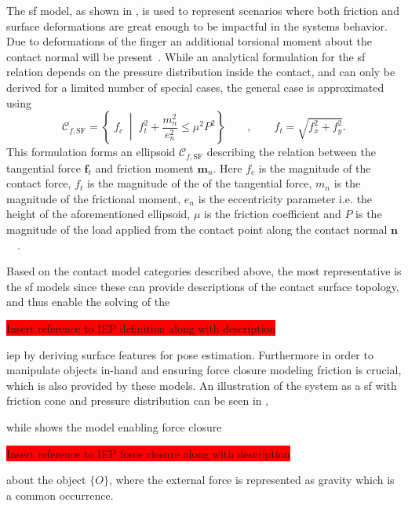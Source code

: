 The \gls{sf} model, as shown in , is used to represent scenarios where both friction and surface deformations are great enough to be impactful in the systems behavior. Due to deformations of the finger an additional torsional moment about the contact normal will be present~\cite[Chapter 38]{handbook-of-robotics}. While an analytical formulation for the \gls{sf} relation depends on the pressure distribution inside the contact, and
can only be derived for a limited number of special cases, the general case is approximated using 
%
\begin{equation} 
	\mathcal{C}_{f,\text{SF}} = \left\{ \; f_c \; \middle| \; f_t^2 + \frac{m_n^2}{e_n^2} \le \mu^2 P^2 \right\} \qquad , \qquad f_t = \sqrt{f_x^2 + f_y^2}.
	\label{eq:sf}
\end{equation}
This formulation forms an ellipsoid $\mathcal{C}_{f,\text{SF}}$ describing the relation between the tangential force $\bm{f}_t$ and friction moment $\bm{m}_n$. Here $f_c$ is the magnitude of the contact force, $f_t$ is the magnitude of the of the tangential force, $m_n$ is the magnitude of the frictional moment, $e_n$ is the eccentricity parameter i.e. the height of the aforementioned ellipsoid, $\mu$ is the friction coefficient and $P$ is the magnitude of the load applied from the contact point along the contact normal $\bm{n}$~\cite{practical-force-motion-models-for-sliding-manipulation}~\cite{soft-finger-model-with-adaptive-contact-geometry-for-grasping-and-manipulation-tasks}. \medskip

Based on the contact model categories described above, the most representative is the \gls{sf} models since these can provide descriptions of the contact surface topology, and thus enable the solving of the 

\colorbox{red}{Insert reference to IEP definition along with description}

\gls{iep} by deriving surface features for pose estimation. Furthermore in order to manipulate objects in-hand and ensuring force closure modeling friction is crucial, which is also provided by these models. An illustration of the system as a \gls{sf} with friction cone and pressure distribution can be seen in , 

while  shows the model enabling force closure 

\colorbox{red}{Insert reference to IEP force closure along with description}

about the object $\{O\}$, where the external force is represented as gravity which is a common occurrence.

